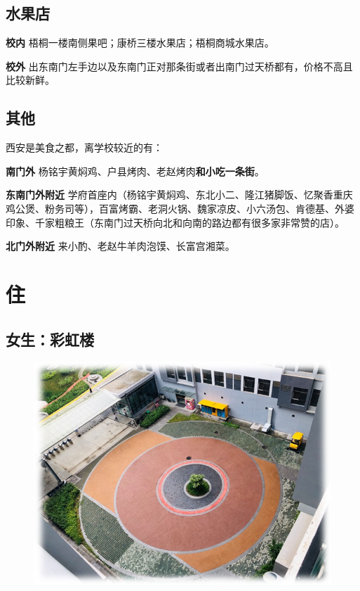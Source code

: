 \documentclass[
decoration,  %
]{qyxf-book}
\begin{document}
	
	\subsection{水果店}
	\textbf{校内}\quad
	梧桐一楼南侧果吧；康桥三楼水果店；梧桐商城水果店。
	
	\textbf{校外}\quad
	出东南门左手边以及东南门正对那条街或者出南门过天桥都有，价格不高且比较新鲜。
	
	\subsection{其他}
	西安是美食之都，离学校较近的有：
	
	\textbf{南门外}\quad
	杨铭宇黄焖鸡、户县烤肉、老赵烤肉\textbf{和小吃一条街}。
	
	\textbf{东南门外附近}\quad
	学府首座内（杨铭宇黄焖鸡、东北小二、隆江猪脚饭、忆聚香重庆鸡公煲、粉务司等），百富烤霸、老洞火锅、魏家凉皮、小六汤包、肯德基、外婆印象、千家粗粮王（东南门过天桥向北和向南的路边都有很多家非常赞的店）。
	
	\textbf{北门外附近}\quad
	来小酌、老赵牛羊肉泡馍、长富宫湘菜。
	
	\newpage
	
	\section{住}
	\subsection{女生：彩虹楼}
	
	\begin{figure}[htbp]
		\centering
		\includegraphics[width=0.8\linewidth]{pics/chp2_rainbow_dormitory}
	\end{figure}
	
\end{document}
